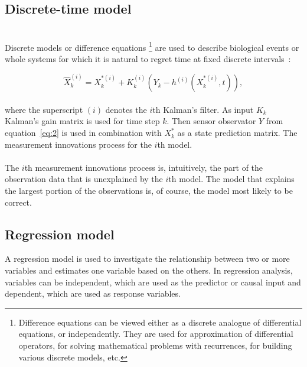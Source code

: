 \subsection{Discrete-time model} \label{subsec:discrete}\\
Discrete models or difference equations \footnote{Difference equations can be viewed either as a discrete analogue of differential equations, or independently.
They are used for approximation of differential operators, for solving mathematical problems with recurrences, for building various discrete
models, etc.} are used to describe biological events or whole systems for which it is natural to regret time at fixed discrete intervals~\cite{pantland}:

\begin{equation} \label{eq:3}
\hat{X}_{k}^{(i)} = X_{k}^{*(i)} + K_k^{(i)}(Y_k - h^{(i)}(X_{k}^{*(i)},t)),
\end{equation}
\\
where the superscript $(i)$ denotes the $i$th Kalman's filter.
As input $K_k$ Kalman's gain matrix is used for time step $k$.
Then sensor observator $Y$ from equation~\ref{eq:2} is used in combination with $X_{k}^{*}$ as a state prediction matrix.
The measurement innovations process for the $i$th model.\\
\\
The $i$th measurement innovations process is, intuitively, the part of the observation data that is unexplained by the $i$th model.
The model that explains the largest portion of the observations is, of course, the model most likely to be correct.\\
\subsection{Regression model} \label{sec:regression}
A regression model is used to investigate the relationship between two or more variables and estimates one variable based on the others.
In regression analysis, variables can be independent, which are used as the predictor or causal input and dependent, which are used as response variables.


